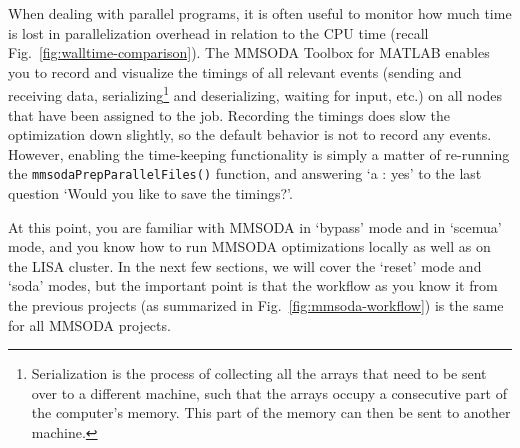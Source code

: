 When dealing with parallel programs, it is often useful to monitor how much time is lost in parallelization overhead in relation to the CPU time (recall Fig.~\ref{fig:walltime-comparison}). The MMSODA Toolbox for MATLAB enables you to record and visualize the timings of all relevant events (sending and receiving data, serializing\footnote{Serialization is the process of collecting all the arrays that need to be sent over to a different machine, such that the arrays occupy a consecutive part of the computer's memory. This part of the memory can then be sent to another machine.} and deserializing, waiting for input, etc.) on all nodes that have been assigned to the job. Recording the timings does slow the optimization down slightly, so the default behavior is not to record any events. However, enabling the time-keeping functionality is simply a matter of re-running the \texttt{mmsodaPrepParallelFiles()} function, and answering `a : yes' to the last question `Would you like to save the timings?'.





At this point, you are familiar with MMSODA in `bypass' mode and in `scemua' mode, and you know how to run MMSODA optimizations locally as well as on the LISA cluster. In the next few sections, we will cover the `reset' mode and `soda' modes, but the important point is that the workflow as you know it from the previous projects (as summarized in Fig.~\ref{fig:mmsoda-workflow}) is the same for all MMSODA projects.

